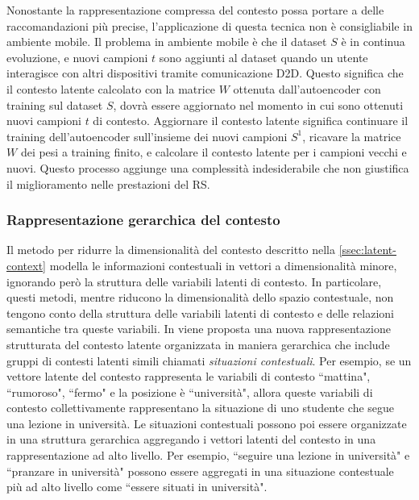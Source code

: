 \documentclass[12pt,italian]{report}
\begin{document}
Nonostante la rappresentazione compressa del contesto possa portare a delle raccomandazioni più precise, l'applicazione di questa tecnica non è consigliabile in ambiente mobile. Il problema in ambiente mobile è che il dataset $S$ è in continua evoluzione, e nuovi campioni $t$ sono aggiunti al dataset quando un utente interagisce con altri dispositivi tramite comunicazione D2D. Questo significa che il contesto latente calcolato con la matrice $W$ ottenuta dall'autoencoder con training sul dataset $S$, dovrà essere aggiornato nel momento in cui sono ottenuti nuovi campioni $t$ di contesto. Aggiornare il contesto latente significa continuare il training dell'autoencoder sull'insieme dei nuovi campioni $S^1$, ricavare la matrice $W$ dei pesi a training finito, e calcolare il contesto latente per i campioni vecchi e nuovi. Questo processo aggiunge una complessità indesiderabile che non giustifica il miglioramento nelle prestazioni del RS.

\subsubsection{Rappresentazione gerarchica del contesto}
\label{ssec:hierarchical}
Il metodo per ridurre la dimensionalità del contesto descritto nella \autoref{ssec:latent-context} modella le informazioni contestuali in vettori a dimensionalità minore, ignorando però la struttura delle variabili latenti di contesto. In particolare, questi metodi, mentre riducono la dimensionalità dello spazio contestuale, non tengono conto della struttura delle variabili latenti di contesto e delle relazioni semantiche tra queste variabili. In \cite{hierarchical-context} viene proposta una nuova rappresentazione strutturata del contesto latente organizzata in maniera gerarchica che include gruppi di contesti latenti simili chiamati \textit{situazioni contestuali}. Per esempio, se un vettore latente del contesto rappresenta le variabili di contesto ``mattina", ``rumoroso", ``fermo" e la posizione è ``università", allora queste variabili di contesto collettivamente rappresentano la situazione di uno studente che segue una lezione in università. Le situazioni contestuali possono poi essere organizzate in una struttura gerarchica aggregando i vettori latenti del contesto in una rappresentazione ad alto livello. Per esempio, ``seguire una lezione in università" e ``pranzare in università" possono essere aggregati in una situazione contestuale più ad alto livello come ``essere situati in università".
\end{document}
